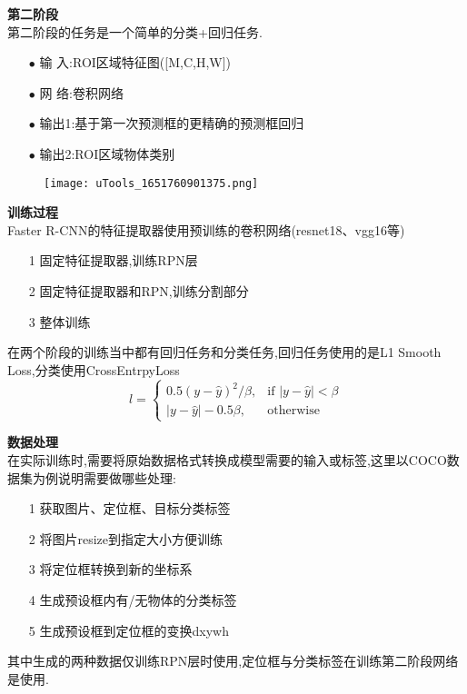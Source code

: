 \begin{frame}
    \vspace{0.5em}
    \noindent\large\textbf{第二阶段}\\
    \vspace{0.5em}
    第二阶段的任务是一个简单的分类+回归任务.
    \begin{itemize}
        \item[$ \bullet $]输 入:ROI区域特征图([M,C,H,W])
        \item[$ \bullet $]网 络:卷积网络
        \item[$ \bullet $]输出1:基于第一次预测框的更精确的预测框回归
        \item[$ \bullet $]输出2:ROI区域物体类别
    \end{itemize}
    \begin{figure}
        \texttt{[image: uTools\_1651760901375.png]}
    \end{figure}
\end{frame}

\begin{frame}
    \vspace{0.5em}
    \noindent\large\textbf{训练过程}\\
    \vspace{0.5em}
    Faster R-CNN的特征提取器使用预训练的卷积网络(resnet18、vgg16等)
    \begin{itemize}
        \item[1]固定特征提取器,训练RPN层
        \item[2]固定特征提取器和RPN,训练分割部分
        \item[3]整体训练
    \end{itemize}
    在两个阶段的训练当中都有回归任务和分类任务,回归任务使用的是L1 Smooth Loss,分类使用CrossEntrpyLoss
    $$
        l = \begin{cases}
            0.5 (y - \hat{y})^2 / \beta, & \text{if } |y - \hat{y}| < \beta \\
            |y - \hat{y}| - 0.5 \beta,   & \text{otherwise }
        \end{cases}
    $$


\end{frame}

\begin{frame}
    \vspace{0.5em}
    \noindent\large\textbf{数据处理}\\
    \vspace{0.5em}
    在实际训练时,需要将原始数据格式转换成模型需要的输入或标签,这里以COCO数据集为例说明需要做哪些处理:
    \begin{itemize}
        \item[1]获取图片、定位框、目标分类标签
        \item[2]将图片resize到指定大小方便训练
        \item[3]将定位框转换到新的坐标系
        \item[4]生成预设框内有/无物体的分类标签
        \item[5]生成预设框到定位框的变换dxywh
    \end{itemize}
    其中生成的两种数据仅训练RPN层时使用,定位框与分类标签在训练第二阶段网络是使用.
\end{frame}

